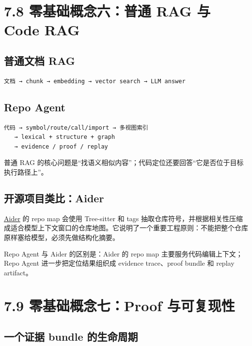 \documentclass[UTF8,12pt,openany]{ctexbook}
\begin{document}
\section{7.8 零基础概念六：普通 RAG 与 Code RAG}

\subsection{普通文档 RAG}

\begin{lstlisting}
文档 → chunk → embedding → vector search → LLM answer
\end{lstlisting}

\subsection{Repo Agent}

\begin{lstlisting}
代码 → symbol/route/call/import → 多视图索引
   → lexical + structure + graph
   → evidence / proof / replay
\end{lstlisting}

普通 RAG 的核心问题是“找语义相似内容”；代码定位还要回答“它是否位于目标执行路径上”。\par

\subsection{开源项目类比：Aider}

\href{https://github.com/Aider-AI/aider}{Aider} 的 repo map 会使用 Tree-sitter 和 tags 抽取仓库符号，并根据相关性压缩成适合模型上下文窗口的仓库地图。它说明了一个重要工程原则：不能把整个仓库原样塞给模型，必须先做结构化摘要。\par

Repo Agent 与 Aider 的区别是：Aider 的 repo map 主要服务代码编辑上下文；Repo Agent 进一步把定位结果组织成 evidence trace、proof bundle 和 replay artifact。\par

\section{7.9 零基础概念七：Proof 与可复现性}

\subsection{一个证据 bundle 的生命周期}
\end{document}
